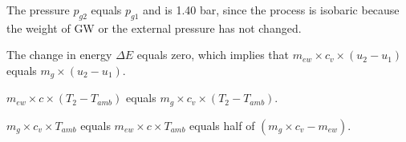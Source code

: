 The pressure \( p_{g2} \) equals \( p_{g1} \) and is 1.40 bar, since the process is isobaric because the weight of GW or the external pressure has not changed.

The change in energy \( \Delta E \) equals zero, which implies that \( m_{ew} \times c_v \times (u_2 - u_1) \) equals \( m_g \times (u_2 - u_1) \).

\( m_{ew} \times c \times (T_2 - T_{amb}) \) equals \( m_g \times c_v \times (T_2 - T_{amb}) \).

\( m_g \times c_v \times T_{amb} \) equals \( m_{ew} \times c \times T_{amb} \) equals half of \( (m_g \times c_v - m_{ew}) \).